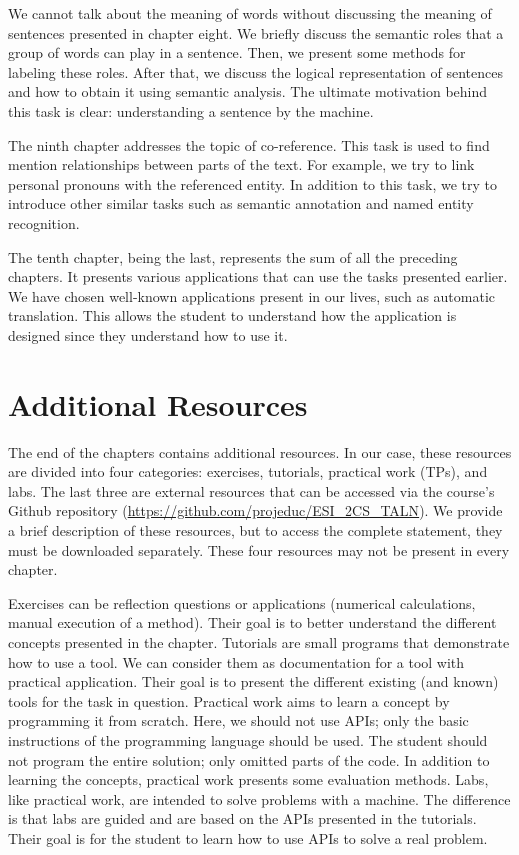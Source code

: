\documentclass{KBook}
\begin{document}
We cannot talk about the meaning of words without discussing the meaning of sentences presented in chapter eight.
We briefly discuss the semantic roles that a group of words can play in a sentence.
Then, we present some methods for labeling these roles.
After that, we discuss the logical representation of sentences and how to obtain it using semantic analysis.
The ultimate motivation behind this task is clear: understanding a sentence by the machine.

The ninth chapter addresses the topic of co-reference.
This task is used to find mention relationships between parts of the text.
For example, we try to link personal pronouns with the referenced entity.
In addition to this task, we try to introduce other similar tasks such as semantic annotation and named entity recognition.

The tenth chapter, being the last, represents the sum of all the preceding chapters.
It presents various applications that can use the tasks presented earlier.
We have chosen well-known applications present in our lives, such as automatic translation.
This allows the student to understand how the application is designed since they understand how to use it.

\section*{Additional Resources}

The end of the chapters contains additional resources.
In our case, these resources are divided into four categories: exercises, tutorials, practical work (TPs), and labs.
The last three are external resources that can be accessed via the course's Github repository (\url{https://github.com/projeduc/ESI_2CS_TALN}).
We provide a brief description of these resources, but to access the complete statement, they must be downloaded separately.
These four resources may not be present in every chapter.

Exercises can be reflection questions or applications (numerical calculations, manual execution of a method).
Their goal is to better understand the different concepts presented in the chapter.
Tutorials are small programs that demonstrate how to use a tool.
We can consider them as documentation for a tool with practical application.
Their goal is to present the different existing (and known) tools for the task in question.
Practical work aims to learn a concept by programming it from scratch.
Here, we should not use APIs; only the basic instructions of the programming language should be used.
The student should not program the entire solution; only omitted parts of the code.
In addition to learning the concepts, practical work presents some evaluation methods.
Labs, like practical work, are intended to solve problems with a machine.
The difference is that labs are guided and are based on the APIs presented in the tutorials.
Their goal is for the student to learn how to use APIs to solve a real problem.

\ifx\wholebook\relax\else
% 
% 
\end{document}
